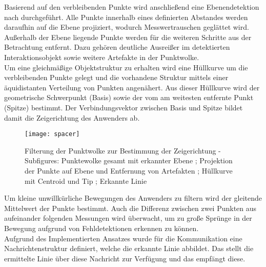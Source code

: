 \red[Bemaßung?\\]

Basierend auf den verbleibenden Punkte wird anschließend eine Ebenendetektion nach \cite{Fischler1981} durchgeführt. Alle Punkte innerhalb eines definierten Abstandes werden daraufhin auf die \red[approximierte] Ebene projiziert, wodurch Messwertrauschen geglättet wird. Außerhalb der Ebene liegende Punkte werden für die weiteren Schritte aus der Betrachtung entfernt. Dazu gehören deutliche Ausreißer im detektierten Interaktionsobjekt sowie weitere Artefakte in der Punktwolke.\\

Um eine gleichmäßige Objektstruktur zu erhalten wird eine Hüllkurve um die verbleibenden Punkte gelegt und die vorhandene Struktur mittels einer äquidistanten Verteilung von Punkten angenähert. Aus dieser Hüllkurve wird der geometrische Schwerpunkt (Basis) sowie der vom \kps{} am weitesten entfernte Punkt (Spitze) bestimmt. Der Verbindungsvektor zwischen Basis und Spitze bildet damit die Zeigerichtung des Anwenders ab.\\

\begin{figure}[!ht]
	\begin{center}
		\texttt{[image: spacer]}
		\caption{Filterung der Punktwolke zur Bestimmung der Zeigerichtung - Subfigures: Punktewolke gesamt mit erkannter Ebene ; Projektion der Punkte auf Ebene und Entfernung von Artefakten ; Hüllkurve mit Centroid und Tip ; Erkannte Linie}
		\label{fig.intdir}
	\end{center}
\end{figure}

Um kleine unwillkürliche Bewegungen des Anwenders zu filtern wird der gleitende Mittelwert der Punkte bestimmt. Auch die Differenz zwischen zwei Punkten aus aufeinander folgenden Messungen wird überwacht, um zu große Sprünge in der Bewegung aufgrund von Fehldetektionen erkennen zu können.\\
Aufgrund des Implementierten Ansatzes wurde für die Kommunikation eine Nachrichtenstruktur definiert, welche die erkannte Linie abbildet. Das \mInteraction stellt die ermittelte Linie über diese Nachricht zur Verfügung und das \red[\mVisualization ?] empfängt diese.\\

